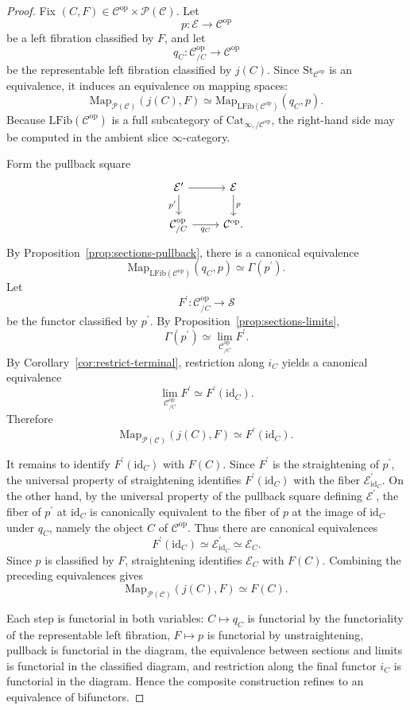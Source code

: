 \documentclass[11pt]{article}
\theoremstyle{definition}
\newcommand{\C}{\mathcal{C}}
\newcommand{\Sps}{\mathcal{S}}
\newcommand{\PSh}{\mathcal{P}(\mathcal{C})}
\newcommand{\E}{\mathcal{E}}
\newcommand{\Ep}{\mathcal{E}^{\prime}}
\newcommand{\Map}{\mathrm{Map}}
\newcommand{\LFib}{\mathrm{LFib}}
\newcommand{\St}{\mathrm{St}}
\newcommand{\id}{\mathrm{id}}
\newcommand{\op}{\mathrm{op}}
\begin{document}
\begin{proof}
Fix $(C,F) \in \C^{\op} \times \PSh$. Let
\[
  p \colon \E \to \C^{\op}
\]
be a left fibration classified by $F$, and let
\[
  q_C \colon \C^{\op}_{/C} \to \C^{\op}
\]
be the representable left fibration classified by $j(C)$. Since
$\St_{\C^{\op}}$ is an equivalence, it induces an equivalence on mapping spaces:
\[
  \Map_{\PSh}(j(C),F)
  \simeq
  \Map_{\LFib(\C^{\op})}(q_C,p).
\]
Because $\LFib(\C^{\op})$ is a full subcategory of $\mathrm{Cat}_{\infty,/\C^{\op}}$, the
right-hand side may be computed in the ambient slice $\infty$-category.

Form the pullback square
\[
\begin{tikzcd}
\Ep \arrow[r] \arrow[d, "p^{\prime}"'] & \E \arrow[d, "p"] \\
\C^{\op}_{/C} \arrow[r, "q_C"'] & \C^{\op}.
\end{tikzcd}
\]
By Proposition~\ref{prop:sections-pullback}, there is a canonical equivalence
\[
  \Map_{\LFib(\C^{\op})}(q_C,p) \simeq \Gamma(p^{\prime}).
\]
Let
\[
  F^{\prime} \colon \C^{\op}_{/C} \to \Sps
\]
be the functor classified by $p^{\prime}$. By
Proposition~\ref{prop:sections-limits},
\[
  \Gamma(p^{\prime}) \simeq \lim_{\C^{\op}_{/C}} F^{\prime}.
\]
By Corollary~\ref{cor:restrict-terminal}, restriction along $i_C$ yields a
canonical equivalence
\[
  \lim_{\C^{\op}_{/C}} F^{\prime} \simeq F^{\prime}(\id_C).
\]
Therefore
\[
  \Map_{\PSh}(j(C),F) \simeq F^{\prime}(\id_C).
\]

It remains to identify $F^{\prime}(\id_C)$ with $F(C)$. Since $F^{\prime}$ is the
straightening of $p^{\prime}$, the universal property of straightening identifies
$F^{\prime}(\id_C)$ with the fiber $\Ep_{\id_C}$. On the other hand, by the
universal property of the pullback square defining $\Ep$, the fiber of
$p^{\prime}$ at $\id_C$ is canonically equivalent to the fiber of $p$ at the image
of $\id_C$ under $q_C$, namely the object $C$ of $\C^{\op}$. Thus there are
canonical equivalences
\[
  F^{\prime}(\id_C) \simeq \Ep_{\id_C} \simeq \E_C.
\]
Since $p$ is classified by $F$, straightening identifies $\E_C$ with $F(C)$.
Combining the preceding equivalences gives
\[
  \Map_{\PSh}(j(C),F) \simeq F(C).
\]

Each step is functorial in both variables: $C \mapsto q_C$ is functorial by the
functoriality of the representable left fibration, $F \mapsto p$ is functorial by
unstraightening, pullback is functorial in the diagram, the equivalence between
sections and limits is functorial in the classified diagram, and restriction
along the final functor $i_C$ is functorial in the diagram. Hence the composite
construction refines to an equivalence of bifunctors.
\end{proof}
\end{document}
